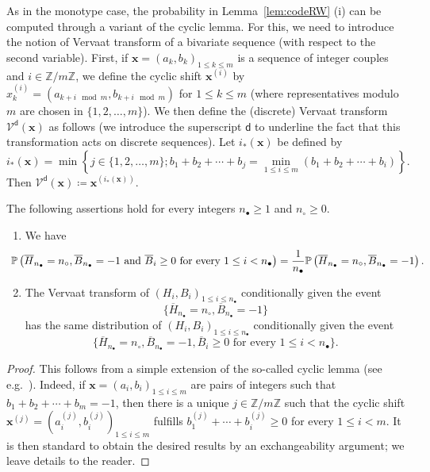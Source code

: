 \documentclass[AHL,XML,longabstracts,Unicode]{cedram}
\newcommand{\Z}{\mathbb{Z}}
\def\Vcd{\mathcal{V}^{\mathsf{d}}}
\def\nc{n_{\circ}}
\def\nb{n_{\bullet}}
\def\oB{\overline{B}}
\def\oH{\overline{H}}
\renewcommand\Pr[1]{\mathbb{P}\left(#1\right)}
\begin{document}
As in the monotype case, the probability in Lemma~\ref{lem:codeRW} (i)
can be computed through a variant of the cyclic lemma.
For this, we need to introduce the notion of Vervaat transform of a bivariate sequence (with respect to the second variable).
First, if $\mathbf{x}=(a_{k},b_{k})_{1 \leq k \leq m}$ is a sequence of integer couples and $i \in \Z/m\Z$, we define the cyclic shift $\mathbf{x}^{(i)}$ by $x^{(i)}_k=(a_{k+i \mod m},b_{k+i \mod m})$ for $1 \leq k \leq m$ (where representatives modulo $m$ are chosen in $ \{1,2, \ldots,m\}$).  We then define the (discrete) Vervaat transform $ \Vcd(\mathbf{x})$ as follows (we introduce the superscript $\mathsf{d}$ to underline the fact that this transformation acts on discrete sequences). Let $i_{*}(\mathbf{x})$ be defined by
\[i_{*}(\mathbf{x}) = \min \left\{ j  \in \{1,2, \ldots,m\} ; b_{1}+b_{2}+\cdots+b_{j}= \min_{1 \leq i \leq m} (b_{1}+b_{2}+\cdots+b_{i}) \right\}.\]
Then $\Vcd(\mathbf{x}) \coloneqq \mathbf{x}^{(i_{*}(\mathbf{x}))}$.

\begin{lemma}\label{lem:vervaat}
The following assertions hold for every integers $\nb \geq 1$ and $\nc \geq 0$.
\begin{enumerate}
\item[(i)] We have
  \[\hspace{-5mm}\Pr{\oH_{\nb}=\nc, \oB_{\nb}=-1 \textrm{ and } \oB_{i} \geq 0 \textrm{ for every } 1 \leq i <\nb }= \frac{1}{\nb} \Pr{\oH_{\nb}=\nc, \oB_{\nb}=-1 }.\]
\item[(ii)] The Vervaat transform of $(H_{i},B_{i})_{1 \leq i \leq \nb}$ conditionally given the event
\[ \{\oH_{\nb}=\nc, \oB_{\nb}=-1 \}\]
has the same distribution of $(H_{i},B_{i})_{1 \leq i \leq \nb}$ conditionally given the event
\[ \{\oH_{\nb}=\nc, \oB_{\nb}=-1, \oB_{i} \geq 0 \textrm{ for every } 1 \leq i <\nb \}.\]
\end{enumerate}
\end{lemma}
\begin{proof}This follows from a simple extension of the so-called cyclic lemma (see e.g.~\cite[Lemma 6.1]{Pit06}). Indeed, if $\mathbf{x}=(a_{i},b_{i})_{1 \leq i \leq m}$ are pairs of integers such that $b_{1}+b_{2}+\cdots+b_{m}=-1$, then there is a unique $j \in \Z/m\Z$ such that the cyclic shift $\mathbf{x}^{(j)}=(a^{(j)}_{i},b^{(j)}_{i})_{1 \leq i \leq m}$ fulfills $b^{(j)}_{1}+ \cdots +b^{(j)}_{i} \geq 0$ for every $1 \leq i<m$. It is then standard to obtain the desired results by an exchangeability argument; we leave details to the reader.
\end{proof}
\end{document}
